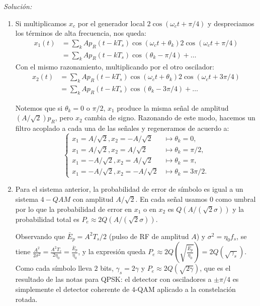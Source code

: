 \documentclass[a4paper,11pt]{article}
\newenvironment{solucion}[1][]{
\noindent \large \textsl{Solución:} \ifthenelse{\equal{#1}{}}{}{\emph{(#1)}}

\smallskip
}{
\bigskip
}
\begin{document}
\begin{solucion}
        \begin{enumerate}
        \item  Si multiplicamos $x_c$ por el generador local $2\cos(\omega_c t + \pi/4)$ y despreciamos los términos de alta frecuencia, nos queda:
        \begin{align*}
                x_1(t) &= \sum_k Ap_R(t-kT_s)\cos(\omega_c t + \theta_k)2\cos(\omega_c t + \pi/4) \\
                &= \sum_k Ap_R(t-kT_s)\cos(\theta_k-\pi/4) + \ldots
        \end{align*}
        Con el mismo razonamiento, multiplicando por el otro oscilador:
        \begin{align*}
                x_2(t) &= \sum_k Ap_R(t-kT_s)\cos(\omega_c t + \theta_k)2\cos(\omega_c t + 3\pi/4) \\
                &= \sum_k Ap_R(t-kT_s)\cos(\theta_k-3\pi/4) + \ldots
        \end{align*}

        Notemos que si $\theta_k=0$ o $\pi/2$, $x_1$ produce la misma señal de amplitud $(A/\sqrt{2})p_R$, pero $x_2$ cambia de signo. Razonando de este modo, hacemos un filtro acoplado a cada una de las señales y regeneramos de acuerdo a:
        \begin{equation*}
                \begin{cases}
                        x_1 = A/\sqrt{2}, x_2 = -A/\sqrt{2} & \mapsto \theta_k = 0,\\
                        x_1 = A/\sqrt{2}, x_2 = A/\sqrt{2} & \mapsto \theta_k = \pi/2,\\
                        x_1 = -A/\sqrt{2}, x_2 = A/\sqrt{2} & \mapsto \theta_k = \pi,\\
                        x_1 = -A/\sqrt{2}, x_2 = -A/\sqrt{2} & \mapsto \theta_k = 3\pi/2.
                \end{cases}
        \end{equation*}

        \item Para el sistema anterior, la probabilidad de error de símbolo es igual a un sistema $4-QAM$ con amplitud $A/\sqrt{2}$. En cada señal usamos $0$ como umbral por lo que la probabilidad de error en $x_1$ o en $x_2$ es $Q(A/(\sqrt{2}\sigma))$ y la probabilidad total es $P_e\approx 2Q(A/(\sqrt{2}\sigma))$.
        
        Observando que $\bar{E}_p = A^2 T_s/2$ (pulso de RF de amplitud $A$) y $\sigma^2=\eta_0 f_s$, se tiene $\frac{A^2}{2\sigma^2}=\frac{A^2T_s}{2\eta_0}=\frac{\bar E_p}{\eta_0}$, y la expresión queda $P_e \approx 2Q\left(\sqrt{\frac{\bar{E}_p}{\eta_0}}\right) = 2Q(\sqrt{\gamma_s})$. Como cada símbolo lleva $2$ bits, $\gamma_s=2\gamma$ y $P_e\approx 2Q(\sqrt{2\gamma})$, que es el resultado de las notas para QPSK: el detector con osciladores a $\pm\pi/4$ es simplemente el detector coherente de $4$-QAM aplicado a la constelación rotada.
\end{enumerate}
\end{solucion}
\end{document}
